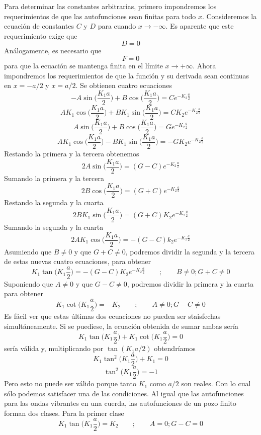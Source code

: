 \documentclass[12pt,a4paper]{article}
\begin{document}
Para determinar las constantes arbitrarias, primero impondremos los requerimientos de que las autofunciones sean finitas para todo $x$. Consideremos la ecuación de constantes $C$ y $D$ para cuando $x \rightarrow -\infty$. Es aparente que este requerimiento exige que
\[ D=0 \]
Análogamente, es necesario que
\[ F=0 \]
para que la ecuación se mantenga finita en el límite $x\rightarrow +\infty$. Ahora impondremos los requerimientos de que la función y su derivada sean continuas en $x=-a/2$ y $x=a/2$. Se obtienen cuatro ecuaciones
\[ -A \sin \bigg( \frac{K_{1}a}{2} \bigg) + B \cos \bigg( \frac{K_{1}a}{2} \bigg)=Ce^{-K_{2}\frac{a}{2}} \]
\[ AK_{1} \cos \bigg( \frac{K_{1}a}{2} \bigg) + B K_{1} \sin \bigg( \frac{K_{1}a}{2} \bigg)=CK_{2}e^{-K_{2}\frac{a}{2}} \]
\[ A \sin \bigg( \frac{K_{1}a}{2} \bigg) + B \cos \bigg( \frac{K_{1}a}{2} \bigg)=Ge^{-K_{2}\frac{a}{2}} \]
\[ AK_{1} \cos \bigg( \frac{K_{1}a}{2} \bigg) - BK_{1} \sin \bigg( \frac{K_{1}a}{2} \bigg)=-GK_{2}e^{-K_{2}\frac{a}{2}} \]
Restando la primera y la tercera obtenemos
\[ 2A \sin \bigg( \frac{K_{1}a}{2} \bigg) =(G-C)e^{-K_{2}\frac{a}{2}} \]
Sumando la primera y  la tercera
\[ 2B \cos \bigg( \frac{K_{1}a}{2} \bigg)=(G+C)e^{-K_{2}\frac{a}{2}} \]
Restando la segunda y la cuarta
\[ 2BK_{1} \sin \bigg( \frac{K_{1}a}{2} \bigg) =(G+C)K_{2}e^{-K_{2}\frac{a}{2}} \]
Sumando la segunda y la cuarta
\[ 2AK_{1} \cos \bigg( \frac{K_{1}a}{2} \bigg) =-(G-C)k_{2}e^{-K_{2}\frac{a}{2}} \]
Asumiendo que $B\neq 0$ y que $G+C \neq 0$, podremos dividir la segunda y la tercera de estas nuevas cuatro ecuaciones, para obtener
\[ K_{1} \tan  \bigg( K_{1} \frac{a}{2} \bigg) =-(G-C)K_{2}e^{-K_{2}\frac{a}{2}} \qquad ; \qquad B\neq0;G+C \neq 0\]
Suponiendo que $A\neq 0$ y que $G-C \neq 0$, podremos dividir la primera y la cuarta para obtener
\[ K_{1} \cot \bigg( K_{1} \frac{a}{2} \bigg) = -K_{2} \qquad ; \qquad A \neq 0; G-C \neq 0 \]
Es fácil ver que estas últimas dos ecuaciones no pueden ser staisfechas simultáneamente. Si se puediese, la ecuación obtenida de sumar ambas sería
\[ K_{1} \tan  \bigg( K_{1} \frac{a}{2} \bigg)+ K_{1} \cot \bigg( K_{1} \frac{a}{2} \bigg)=0 \]
sería válida y, multiplicando por $\tan (K_{1}a/2)$ obtendríamos
\[ K_{1} \tan^{2} \bigg( K_{1} \frac{a}{2} \bigg)+K_{1}=0 \]
\[ \tan^{2} \bigg( K_{1} \frac{a}{2} \bigg)=-1 \]
Pero esto no puede ser válido porque tanto $K_{1}$ como $a/2$ son reales. Con lo cual sólo podemos satisfacer una de las condiciones. Al igual que las autofunciones para las ondas vibrantes en una cuerda, las autofunciones de un pozo finito forman dos clases. Para la primer clase
\[ K_{1} \tan \bigg( K_{1} \frac{a}{2} \bigg)=K_{2} \qquad ; \qquad A=0;G-C=0 \]
\end{document}
